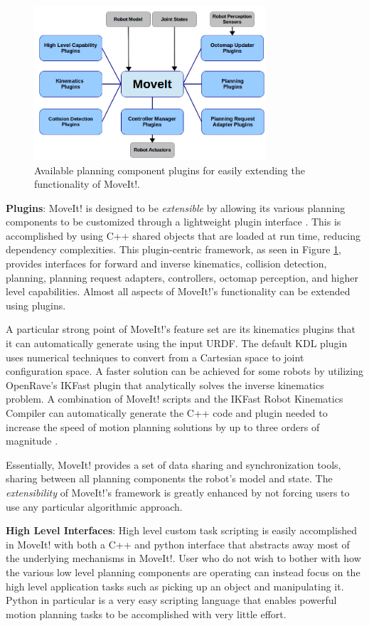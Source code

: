 \documentclass[10pt,journal,compsoc]{joser1}
\begin{document}
{\begin{figure}[!t]
\centering
\includegraphics[width=3.4in]{images/moveit_plugins}
\caption{Available planning component plugins for easily extending the functionality of MoveIt!.}
\label{fig:moveit_plugins}
\end{figure}

{\bf Plugins}: MoveIt! is designed to be \textit{extensible} by allowing its various planning components to be customized through a lightweight plugin interface \cite{moveit}. This is accomplished by using C++ shared objects that are loaded at run time, reducing dependency complexities. This plugin-centric framework, as seen in Figure \ref{fig:moveit_plugins}, provides interfaces for forward and inverse kinematics, collision detection, planning, planning request adapters, controllers, octomap perception, and higher level capabilities. Almost all aspects of MoveIt!'s functionality can be extended using plugins.

A particular strong point of MoveIt!'s feature set are its kinematics plugins that it can automatically generate using the input URDF. The default KDL plugin uses numerical techniques to convert from a Cartesian space to joint configuration space. A faster solution can be achieved for some robots by utilizing OpenRave's IKFast \cite{ikfast} plugin that analytically solves the inverse kinematics problem. A combination of MoveIt! scripts and the IKFast Robot Kinematics Compiler can automatically generate the C++ code and plugin needed to increase the speed of motion planning solutions by up to three orders of magnitude \cite{ikfast}.

Essentially, MoveIt! provides a set of data sharing and synchronization tools, sharing between all planning components the robot's model and state. The \textit{extensibility} of MoveIt!'s framework is greatly enhanced by not forcing users to use any particular algorithmic approach. 

{\bf High Level Interfaces}: High level custom task scripting is easily accomplished in MoveIt! with both a C++ and python interface that abstracts away most of the underlying mechanisms in MoveIt!. User who do not wish to bother with how the various low level planning components are operating can instead focus on the high level application tasks such as picking up an object and manipulating it. Python in particular is a very easy scripting language that enables powerful motion planning tasks to be accomplished with very little effort.

}
\end{document}
